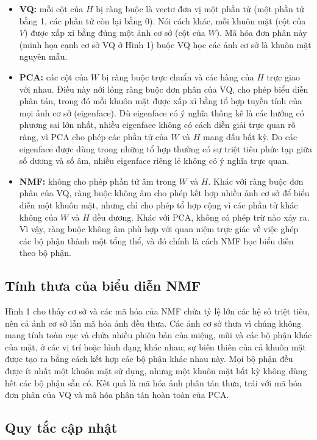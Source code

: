 \begin{itemize}
\item
  \textbf{VQ:} mỗi cột của \(H\) bị ràng buộc là vectơ đơn vị một phần tử (một phần tử bằng 1, các phần tử còn lại bằng 0). Nói cách khác, mỗi khuôn mặt (cột của \(V\)) được xấp xỉ bằng đúng một ảnh cơ sở (cột của \(W\)). Mã hóa đơn phân này (minh họa cạnh cơ sở VQ ở Hình 1) buộc VQ học các ảnh cơ sở là khuôn mặt nguyên mẫu.
\item
  \textbf{PCA:} các cột của \(W\) bị ràng buộc trực chuẩn và các hàng của \(H\) trực giao với nhau. Điều này nới lỏng ràng buộc đơn phân của VQ, cho phép biểu diễn phân tán, trong đó mỗi khuôn mặt được xấp xỉ bằng tổ hợp tuyến tính của mọi ảnh cơ sở (eigenface). Dù eigenface có ý nghĩa thống kê là các hướng có phương sai lớn nhất, nhiều eigenface không có cách diễn giải trực quan rõ ràng, vì PCA cho phép các phần tử của \(W\) và \(H\) mang dấu bất kỳ. Do các eigenface được dùng trong những tổ hợp thường có sự triệt tiêu phức tạp giữa số dương và số âm, nhiều eigenface riêng lẻ không có ý nghĩa trực quan.
\item
  \textbf{NMF:} không cho phép phần tử âm trong \(W\) và \(H\). Khác với ràng buộc đơn phân của VQ, ràng buộc không âm cho phép kết hợp nhiều ảnh cơ sở để biểu diễn một khuôn mặt, nhưng chỉ cho phép tổ hợp cộng vì các phần tử khác không của \(W\) và \(H\) đều dương. Khác với PCA, không có phép trừ nào xảy ra. Vì vậy, ràng buộc không âm phù hợp với quan niệm trực giác về việc ghép các bộ phận thành một tổng thể, và đó chính là cách NMF học biểu diễn theo bộ phận.
\end{itemize}

\subsection{Tính thưa của biểu diễn NMF}

Hình 1 cho thấy cơ sở và các mã hóa của NMF chứa tỷ lệ lớn các hệ số triệt tiêu, nên cả ảnh cơ sở lẫn mã hóa ảnh đều thưa. Các ảnh cơ sở thưa vì chúng không mang tính toàn cục và chứa nhiều phiên bản của miệng, mũi và các bộ phận khác của mặt, ở các vị trí hoặc hình dạng khác nhau; sự biến thiên của cả khuôn mặt được tạo ra bằng cách kết hợp các bộ phận khác nhau này. Mọi bộ phận đều được ít nhất một khuôn mặt sử dụng, nhưng một khuôn mặt bất kỳ không dùng hết các bộ phận sẵn có. Kết quả là mã hóa ảnh phân tán thưa, trái với mã hóa đơn phân của VQ và mã hóa phân tán hoàn toàn của PCA.

\subsection{Quy tắc cập nhật}

